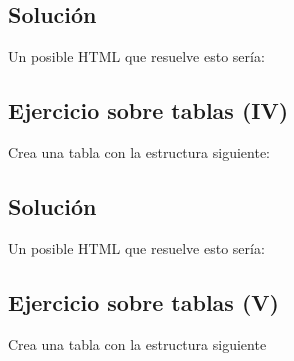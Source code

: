 \documentclass[letterpaper,10pt,spanish]{sphinxmanual}
\begin{document}
\subsection{Solución}
\label{tema2:id4}
Un posible HTML que resuelve esto sería:


\subsection{Ejercicio sobre tablas (IV)}
\label{tema2:ejercicio-sobre-tablas-iv}
Crea una tabla con la estructura siguiente:



\subsection{Solución}
\label{tema2:id5}
Un posible HTML que resuelve esto sería:


\subsection{Ejercicio sobre tablas (V)}
\label{tema2:ejercicio-sobre-tablas-v}
Crea una tabla con la estructura siguiente
\begin{figure}[htbp]
\centering

\noindent{}
\end{figure}
\end{document}
